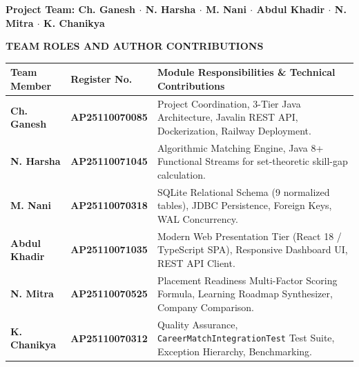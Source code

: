 \documentclass[11pt,a4paper]{report}
\begin{document}
\vspace{0.3cm}
\begin{flushright}
    {\footnotesize \textbf{Project Team: Ch. Ganesh $\cdot$ N. Harsha $\cdot$ M. Nani $\cdot$ Abdul Khadir $\cdot$ N. Mitra $\cdot$ K. Chanikya}}
\end{flushright}

\newpage
\thispagestyle{plain}
\begin{center}
    {\large \textbf{TEAM ROLES AND AUTHOR CONTRIBUTIONS}}\\[0.2cm]
\end{center}

\begin{table}[H]
    \centering
    \scriptsize
    \begin{tabular}{p{2.8cm}p{2.5cm}p{9.5cm}}
        \toprule
        \textbf{Team Member} & \textbf{Register No.} & \textbf{Module Responsibilities \& Technical Contributions} \\
        \midrule
        \textbf{Ch. Ganesh} & \textbf{AP25110070085} & Project Coordination, 3-Tier Java Architecture, Javalin REST API, Dockerization, Railway Deployment. \\
        \textbf{N. Harsha} & \textbf{AP25110071045} & Algorithmic Matching Engine, Java 8+ Functional Streams for set-theoretic skill-gap calculation. \\
        \textbf{M. Nani} & \textbf{AP25110070318} & SQLite Relational Schema (9 normalized tables), JDBC Persistence, Foreign Keys, WAL Concurrency. \\
        \textbf{Abdul Khadir} & \textbf{AP25110071035} & Modern Web Presentation Tier (React 18 / TypeScript SPA), Responsive Dashboard UI, REST API Client. \\
        \textbf{N. Mitra} & \textbf{AP25110070525} & Placement Readiness Multi-Factor Scoring Formula, Learning Roadmap Synthesizer, Company Comparison. \\
        \textbf{K. Chanikya} & \textbf{AP25110070312} & Quality Assurance, \texttt{CareerMatchIntegrationTest} Test Suite, Exception Hierarchy, Benchmarking. \\
        \bottomrule
    \end{tabular}
\end{table}
\end{document}
